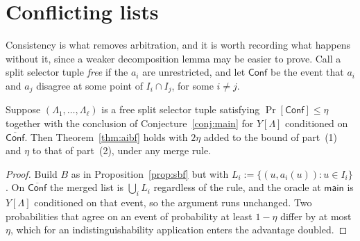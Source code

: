 \documentclass{conjura-conjecture}
\newcommand{\Prob}[1]{\Pr\!\left[#1\right]}
\newcommand{\main}{\mathsf{main}}
\begin{document}
\section{Conflicting lists}\label{sec:conflict}

Consistency is what removes arbitration, and it is worth recording what
happens without it, since a weaker decomposition lemma may be easier to
prove. Call a split selector tuple \emph{free} if the $a_i$ are
unrestricted, and let $\mathsf{Conf}$ be the event that $a_i$ and $a_j$
disagree at some point of $I_i \cap I_j$, for some $i \ne j$.

\begin{proposition}\label{prop:conflict}
Suppose $(\Lambda_1,\dots,\Lambda_\ell)$ is a free split selector tuple
satisfying $\Prob{\mathsf{Conf}} \le \eta$ together with the conclusion of
Conjecture~\ref{conj:main} for $Y[\Lambda]$ conditioned on
$\overline{\mathsf{Conf}}$. Then Theorem~\ref{thm:aibf} holds with $2\eta$
added to the bound of part~(1) and $\eta$ to that of part~(2), under any
merge rule.
\end{proposition}

\begin{proof}
Build $B$ as in Proposition~\ref{prop:sbf} but with
$L_i := \{(u,a_i(u)) : u \in I_i\}$. On $\overline{\mathsf{Conf}}$ the
merged list is $\bigcup_i L_i$ regardless of the rule, and the oracle at
$\main$ is $Y[\Lambda]$ conditioned on that event, so the argument runs
unchanged. Two probabilities that agree on an event of probability at
least $1-\eta$ differ by at most $\eta$, which for an
indistinguishability application enters the advantage doubled.
\end{proof}
\end{document}
